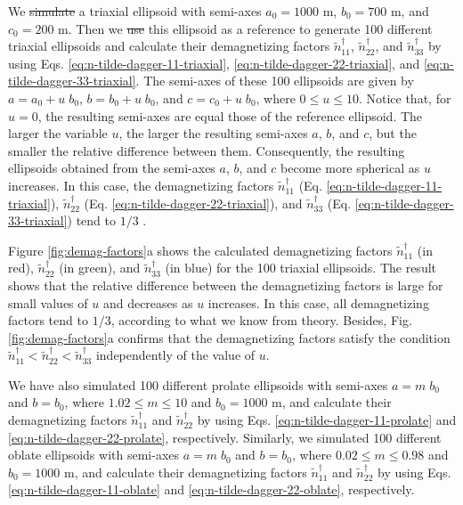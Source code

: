 \documentclass[gmd, manuscript]{copernicus}
\providecommand{\DIFadd}[1]{{\protect\color{blue}\uwave{#1}}} %
\providecommand{\DIFdel}[1]{{\protect\color{red}\sout{#1}}}                      %
\providecommand{\DIFaddbegin}{} %
\providecommand{\DIFaddend}{} %
\providecommand{\DIFdelbegin}{} %
\providecommand{\DIFdelend}{} %
\begin{document}
We \DIFdelbegin \DIFdel{simulate }\DIFdelend \DIFaddbegin \DIFadd{simulated }\DIFaddend a triaxial ellipsoid with semi-axes
$a_{0} = 1000$ \unit{m}, $b_{0} = 700$ \unit{m}, and $c_{0} = 200$ \unit{m}.
Then we \DIFdelbegin \DIFdel{use }\DIFdelend \DIFaddbegin \DIFadd{used }\DIFaddend this ellipsoid as a reference to generate
100 different triaxial ellipsoids and calculate
their demagnetizing factors $\tilde{n}^{\dagger}_{11}$,
$\tilde{n}^{\dagger}_{22}$, and $\tilde{n}^{\dagger}_{33}$
by using Eqs. \ref{eq:n-tilde-dagger-11-triaxial},
\ref{eq:n-tilde-dagger-22-triaxial}, and \ref{eq:n-tilde-dagger-33-triaxial}.
The semi-axes of these 100 ellipsoids are given by
$a = a_{0} + u \; b_{0}$, $b = b_{0} + u \; b_{0}$, and
$c = c_{0} + u \; b_{0}$, where $0 \leq u \leq 10$.
Notice that, for $u = 0$, the resulting semi-axes are equal those
of the reference ellipsoid.
The larger the variable $u$, the larger the resulting semi-axes
$a$, $b$, and $c$, but the smaller the relative difference between
them.
Consequently, the resulting ellipsoids obtained from the semi-axes
$a$, $b$, and $c$ become more spherical as $u$ increases.
In this case, the demagnetizing factors $\tilde{n}^{\dagger}_{11}$
(Eq. \ref{eq:n-tilde-dagger-11-triaxial}),
$\tilde{n}^{\dagger}_{22}$ (Eq. \ref{eq:n-tilde-dagger-22-triaxial}),
and
$\tilde{n}^{\dagger}_{33}$ (Eq. \ref{eq:n-tilde-dagger-33-triaxial})
tend to $1/3$ \citep[e.g.,][]{stoner1945}.

Figure \ref{fig:demag-factors}a shows the calculated
demagnetizing factors $\tilde{n}^{\dagger}_{11}$ (in red),
$\tilde{n}^{\dagger}_{22}$ (in green), and
$\tilde{n}^{\dagger}_{33}$ (in blue) for the
100 triaxial ellipsoids.
The result shows that the relative difference
between the demagnetizing factors is large for
small values of $u$ and decreases as $u$ increases.
In this case, all demagnetizing factors tend to $1/3$, according
to what we know from theory.
Besides, Fig. \ref{fig:demag-factors}a confirms that the demagnetizing
factors satisfy the condition
$\tilde{n}^{\dagger}_{11} < \tilde{n}^{\dagger}_{22} < \tilde{n}^{\dagger}_{33}$
independently of the value of $u$.

We have also simulated 100 different prolate
ellipsoids with semi-axes $a = m \; b_{0}$ and $b = b_{0}$,
where $1.02 \leq m \leq 10$ and $b_{0} = 1000$ \unit{m},
and calculate their demagnetizing factors
$\tilde{n}^{\dagger}_{11}$ and $\tilde{n}^{\dagger}_{22}$
by using Eqs. \ref{eq:n-tilde-dagger-11-prolate} and
\ref{eq:n-tilde-dagger-22-prolate}, respectively.
Similarly, we simulated 100 different oblate
ellipsoids with semi-axes $a = m \; b_{0}$ and $b = b_{0}$,
where $0.02 \leq m \leq 0.98$ and $b_{0} = 1000$ \unit{m},
and calculate their demagnetizing factors
$\tilde{n}^{\dagger}_{11}$ and $\tilde{n}^{\dagger}_{22}$
by using Eqs. \ref{eq:n-tilde-dagger-11-oblate} and
\ref{eq:n-tilde-dagger-22-oblate}, respectively.
\end{document}
